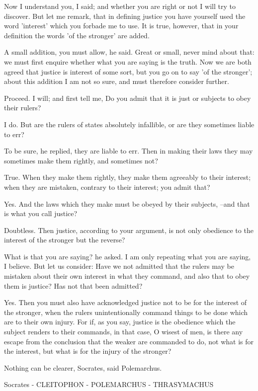 Now I understand you, I said; and whether you are right or not I will try to discover. But let me remark, that in defining justice you have yourself used the word 'interest' which you forbade me to use. It is true, however, that in your definition the words 'of the stronger' are added.

A small addition, you must allow, he said.
Great or small, never mind about that: we must first enquire whether what you are saying is the truth. Now we are both agreed that justice is interest of some sort, but you go on to say 'of the stronger'; about this addition I am not so sure, and must therefore consider further.

Proceed.
I will; and first tell me, Do you admit that it is just or subjects to obey their rulers?

I do.
But are the rulers of states absolutely infallible, or are they sometimes liable to err?

To be sure, he replied, they are liable to err.
Then in making their laws they may sometimes make them rightly, and sometimes not?

True.
When they make them rightly, they make them agreeably to their interest; when they are mistaken, contrary to their interest; you admit that?

Yes.
And the laws which they make must be obeyed by their subjects, --and that is what you call justice?

Doubtless.
Then justice, according to your argument, is not only obedience to the interest of the stronger but the reverse?

What is that you are saying? he asked.
I am only repeating what you are saying, I believe. But let us consider: Have we not admitted that the rulers may be mistaken about their own interest in what they command, and also that to obey them is justice? Has not that been admitted?

Yes.
Then you must also have acknowledged justice not to be for the interest of the stronger, when the rulers unintentionally command things to be done which are to their own injury. For if, as you say, justice is the obedience which the subject renders to their commands, in that case, O wisest of men, is there any escape from the conclusion that the weaker are commanded to do, not what is for the interest, but what is for the injury of the stronger?

Nothing can be clearer, Socrates, said Polemarchus.

Socrates - CLEITOPHON - POLEMARCHUS - THRASYMACHUS

